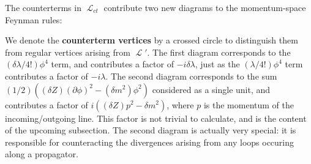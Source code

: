 \documentclass{report}
\theoremstyle{plain}
\theoremstyle{definition}
\theoremstyle{remark}
\DeclareMathOperator{\cL}{\mathcal{L}}
\begin{document}
The counterterms in $\cL_{ct}$ contribute two new diagrams to the
momentum-space Feynman rules:
\begin{center}
  \begin{minipage}{0.3\textwidth}
    \centering
  \end{minipage}
  \begin{minipage}{0.3\textwidth}
    \centering
  \end{minipage}
\end{center}
We denote the {\bf counterterm vertices} by a crossed circle to
distinguish them from regular vertices arising from $\cL'$. The first
diagram corresponds to the $(\delta\lambda/4!)\phi^4$ term, and
contributes a factor of $-i\delta\lambda$, just as the
$(\lambda/4!)\phi^4$ term contributes a factor of $-i\lambda$. The
second diagram corresponds to the sum
$(1/2)((\delta Z)(\partial\phi)^2 - (\delta m^2)\phi^2)$ considered
as a single unit, and contributes a factor of
$i((\delta Z)p^2 - \delta m^2)$, where $p$ is the momentum of the
incoming/outgoing line. This factor is not trivial to calculate, and
is the content of the upcoming subsection. The second diagram is
actually very special: it is responsible for counteracting the
divergences arising from any loops occuring along a propagator.
\end{document}

